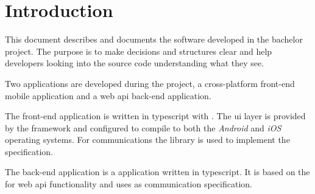 \chapter{Introduction}
This document describes and documents the software developed in the bachelor project.
The purpose is to make decisions and structures clear and help developers looking into the source code understanding what they see.

Two applications are developed during the project, a cross-platform front-end mobile application and a web \gls{api} back-end application.

The front-end application is written in \gls{typescript} with .
The \gls{ui} layer is provided by the  framework and configured to compile to both the \textit{Android} and \textit{iOS} operating systems.
For communications the library  is used to implement the  specification.

The back-end application is a  application written in \gls{typescript}.
It is based on the  for web \gls{api} functionality and uses  as communication specification.
